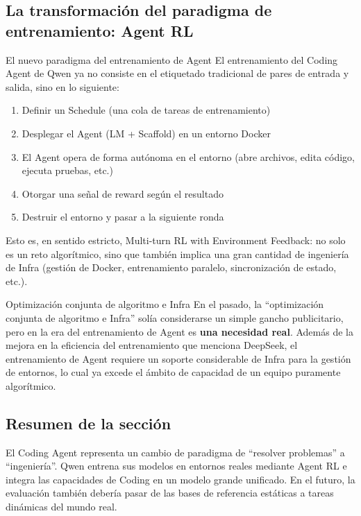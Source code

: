 \subsection{La transformación del paradigma de entrenamiento: Agent RL}

\begin{importantbox}{El nuevo paradigma del entrenamiento de Agent}
El entrenamiento del Coding Agent de Qwen ya no consiste en el etiquetado tradicional de pares de entrada y salida, sino en lo siguiente:
\begin{enumerate}
    \item Definir un Schedule (una cola de tareas de entrenamiento)
    \item Desplegar el Agent (LM + Scaffold) en un entorno Docker
    \item El Agent opera de forma autónoma en el entorno (abre archivos, edita código, ejecuta pruebas, etc.)
    \item Otorgar una señal de reward según el resultado
    \item Destruir el entorno y pasar a la siguiente ronda
\end{enumerate}
Esto es, en sentido estricto, Multi-turn RL with Environment Feedback: no solo es un reto algorítmico, sino que también implica una gran cantidad de ingeniería de Infra (gestión de Docker, entrenamiento paralelo, sincronización de estado, etc.).
\end{importantbox}

\begin{knowledgebox}{Optimización conjunta de algoritmo e Infra}
En el pasado, la ``optimización conjunta de algoritmo e Infra'' solía considerarse un simple gancho publicitario, pero en la era del entrenamiento de Agent es \textbf{una necesidad real}. Además de la mejora en la eficiencia del entrenamiento que menciona DeepSeek, el entrenamiento de Agent requiere un soporte considerable de Infra para la gestión de entornos, lo cual ya excede el ámbito de capacidad de un equipo puramente algorítmico.
\end{knowledgebox}

\subsection{Resumen de la sección}

El Coding Agent representa un cambio de paradigma de ``resolver problemas'' a ``ingeniería''. Qwen entrena sus modelos en entornos reales mediante Agent RL e integra las capacidades de Coding en un modelo grande unificado. En el futuro, la evaluación también debería pasar de las bases de referencia estáticas a tareas dinámicas del mundo real.

